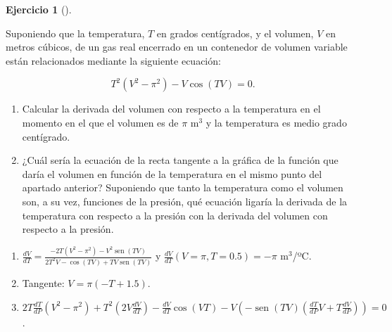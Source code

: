 \documentclass[
  spanish,
  a4paper,
]{scrreport}
\theoremstyle{definition}
\newtheorem{exercise}{Ejercicio}[chapter]
\theoremstyle{remark}
\begin{document}
\begin{exercise}[]\protect\hypertarget{exr-derivada-implicita-2}{}\label{exr-derivada-implicita-2}

Suponiendo que la temperatura, \(T\) en grados centígrados, y el
volumen, \(V\) en metros cúbicos, de un gas real encerrado en un
contenedor de volumen variable están relacionados mediante la siguiente
ecuación:

\[
T^2(V^2-\pi^2)-V\cos(TV) = 0.
\]

\begin{enumerate}
\def\labelenumi{\alph{enumi}.}
\item
  Calcular la derivada del volumen con respecto a la temperatura en el
  momento en el que el volumen es de \(\pi\) m\(^3\) y la temperatura es
  medio grado centígrado.
\item
  ¿Cuál sería la ecuación de la recta tangente a la gráfica de la
  función que daría el volumen en función de la temperatura en el mismo
  punto del apartado anterior? Suponiendo que tanto la temperatura como
  el volumen son, a su vez, funciones de la presión, qué ecuación
  ligaría la derivada de la temperatura con respecto a la presión con la
  derivada del volumen con respecto a la presión.
\end{enumerate}

\end{exercise}

\begin{tcolorbox}[enhanced jigsaw, arc=.35mm, bottomrule=.15mm, bottomtitle=1mm, breakable, colback=white, colbacktitle=quarto-callout-tip-color!10!white, colframe=quarto-callout-tip-color-frame, coltitle=black, left=2mm, leftrule=.75mm, opacityback=0, opacitybacktitle=0.6, rightrule=.15mm, title=\textcolor{quarto-callout-tip-color}{\faLightbulb}\hspace{0.5em}{Solución}, titlerule=0mm, toprule=.15mm, toptitle=1mm]

\begin{enumerate}
\def\labelenumi{\alph{enumi}.}
\item
  \(\frac{dV}{dT} = \frac{-2T(V^2-\pi^2)-V^2\operatorname{sen}(TV)}{2T^2V-\cos(TV)+TV\operatorname{sen}(TV)}\)
  y \(\frac{dV}{dT}(V=\pi,T=0.5)= -\pi\) m\(^3\)/ºC.
\item
  Tangente: \(V=\pi(-T+1.5)\).
\item
  \(2T\frac{dT}{dP}(V^2-\pi^2)+T^2(2V\frac{dV}{dT})-\frac{dV}{dT}\cos(VT)-V(-\operatorname{sen}(TV)(\frac{dT}{dP}V+T\frac{dV}{dP})) =0\).
\end{enumerate}

\end{tcolorbox}
\end{document}
